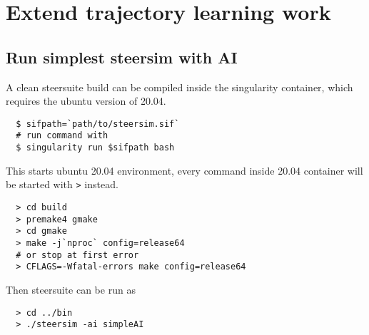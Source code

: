 \chapter{Extend trajectory learning work}

\section{Run simplest steersim with AI} %

A clean steersuite build can be compiled inside the singularity container, 
which requires the ubuntu version of 20.04.

\begin{verbatim}
  $ sifpath=`path/to/steersim.sif`
  # run command with
  $ singularity run $sifpath bash
\end{verbatim}

This starts ubuntu 20.04 environment, every command inside 20.04 container will 
be started with \texttt{>} instead.

\begin{verbatim}
  > cd build
  > premake4 gmake
  > cd gmake
  > make -j`nproc` config=release64
  # or stop at first error
  > CFLAGS=-Wfatal-errors make config=release64
\end{verbatim}

Then steersuite can be run as
\begin{verbatim}
  > cd ../bin
  > ./steersim -ai simpleAI
\end{verbatim}

